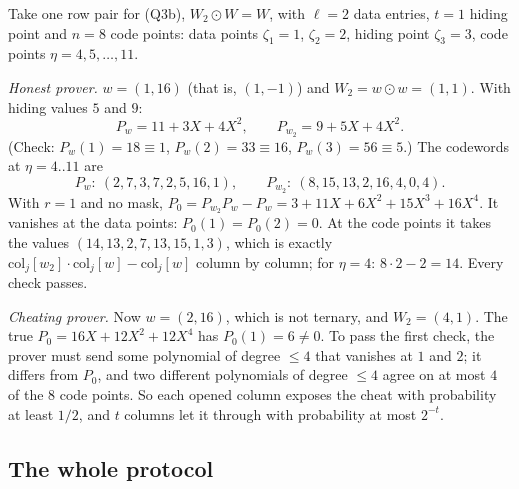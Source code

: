 \documentclass[11pt,a4paper]{article}
\newcommand{\Z}{\mathbb{Z}}
\theoremstyle{definition}
\theoremstyle{plain}
\begin{document}
\begin{example}[The quadratic test over $\Z_{17}$]
Take one row pair for (Q3b), $W_2\odot W=W$, with $\ell=2$ data entries, $t=1$ hiding point and
$n=8$ code points: data points $\zeta_1=1$, $\zeta_2=2$, hiding point $\zeta_3=3$, code points
$\eta=4,5,\dots,11$.

\emph{Honest prover.} $w=(1,16)$ (that is, $(1,-1)$) and $W_2=w\odot w=(1,1)$. With hiding values $5$
and $9$:
\[
  P_w=11+3X+4X^2,\qquad P_{w_2}=9+5X+4X^2 .
\]
(Check: $P_w(1)=18\equiv1$, $P_w(2)=33\equiv16$, $P_w(3)=56\equiv5$.) The codewords at $\eta=4..11$ are
\[
  P_w:\ (2,7,3,7,2,5,16,1),\qquad P_{w_2}:\ (8,15,13,2,16,4,0,4).
\]
With $r=1$ and no mask, $P_0=P_{w_2}P_w-P_w=3+11X+6X^2+15X^3+16X^4$. It vanishes at the data points:
$P_0(1)=P_0(2)=0$. At the code points it takes the values $(14,13,2,7,13,15,1,3)$, which is exactly
$\mathrm{col}_j[w_2]\cdot\mathrm{col}_j[w]-\mathrm{col}_j[w]$ column by column; for $\eta=4$:
$8\cdot2-2=14$. Every check passes.

\emph{Cheating prover.} Now $w=(2,16)$, which is not ternary, and $W_2=(4,1)$. The true
$P_0=16X+12X^2+12X^4$ has $P_0(1)=6\ne0$. To pass the first check, the prover must send some
polynomial of degree $\le4$ that vanishes at $1$ and $2$; it differs from $P_0$, and two different
polynomials of degree $\le4$ agree on at most $4$ of the $8$ code points. So each opened column
exposes the cheat with probability at least $1/2$, and $t$ columns let it through with probability
at most $2^{-t}$.
\end{example}

\subsection{The whole protocol}
\end{document}
